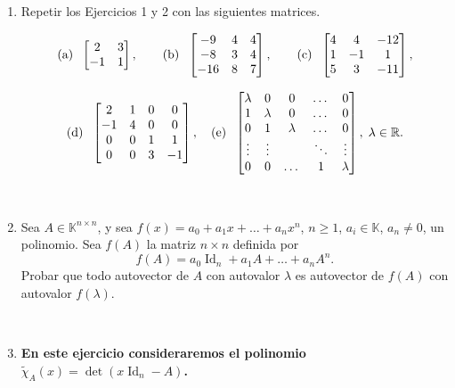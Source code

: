 \documentclass[12pt]{amsart}
\begin{document}
\begin{enumerate}[resume]

\item\label{mas} Repetir los Ejercicios 1 y 2 con las siguientes matrices.

$$\textrm{(a)\; }\begin{bmatrix} 2 & 3 \\ -1 & 1
\end{bmatrix}, \qquad
\textrm{(b)\; }\begin{bmatrix} -9 & 4 & 4 \\ -8 & 3 & 4 \\ -16 & 8 & 7 \end{bmatrix}, \qquad \textrm{(c)\; } \left[\begin{matrix}4 & 4 & -12\\ 1 & -1 & 1\\ 5 & 3 & -11 \end{matrix} \right],$$

$$
\textrm{(d)\; } \left[\begin{matrix}2 & 1 & 0 & 0\\ -1 & 4 & 0 & 0\\ 0 & 0 & 1 & 1 \\ 0 & 0 & 3 & -1\end{matrix} \right],
\quad \textrm{(e)\; } \begin{bmatrix} \lambda & 0 & 0 & \dots & 0  \\ 1 & \lambda & 0 &\dots & 0  \\ 0 & 1 & \lambda&  \dots & 0  \\ \vdots & \vdots & \quad & \ddots & \vdots\\ 0 &  0&   \dots & 1  & \lambda \end{bmatrix}, \; \lambda\in \mathbb R.
$$

\

\item Sea $A\in\mathbb{K}^{n\times n}$, y sea $f(x) = a_0 + a_1 x + \dots + a_nx^n$, $n \geq 1$, $a_i\in\mathbb{K}$, $a_n \neq 0$, un polinomio. Sea $f(A)$ la matriz $n \times n$ definida por
$$f(A) = a_0 \operatorname{Id}_n + a_1 A + \dots + a_n A^n.$$
Probar que todo autovector de $A$ con autovalor $\lambda$ es autovector de $f(A)$ con autovalor $f(\lambda)$.

\

\item {\bf En este ejercicio consideraremos el polinomio $\tilde\chi_A(x)=\det(x\operatorname{Id}_n-A)$.}

\begin{enumerate}


\end{enumerate}
\end{enumerate}
\end{document}
